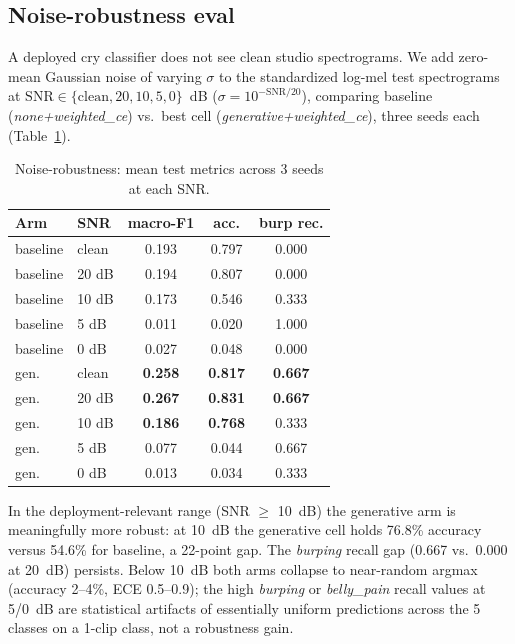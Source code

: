 \documentclass[pmlr,twocolumn,10pt]{jmlr}
\begin{document}
\subsection{Noise-robustness eval}\label{sec:noiserob}
A deployed cry classifier does not see clean studio spectrograms. We add zero-mean Gaussian noise of varying $\sigma$ to the standardized log-mel test spectrograms at $\mathrm{SNR} \in \{\text{clean}, 20, 10, 5, 0\}$~dB ($\sigma{=}10^{-\mathrm{SNR}/20}$), comparing baseline (\textit{none+weighted\_ce}) vs.\ best cell (\textit{generative+weighted\_ce}), three seeds each (Table~\ref{tab:robustness}).

\begin{table}[!t]
\centering
\footnotesize
\renewcommand{\arraystretch}{0.95}
\caption{Noise-robustness: mean test metrics across 3 seeds at each SNR.}\label{tab:robustness}
\begin{tabular}{llccc}
\toprule
Arm & SNR & macro-F1 & acc. & burp rec. \\
\midrule
baseline & clean & 0.193 & 0.797 & 0.000 \\
baseline & 20 dB & 0.194 & 0.807 & 0.000 \\
baseline & 10 dB & 0.173 & 0.546 & 0.333 \\
baseline & 5 dB  & 0.011 & 0.020 & 1.000 \\
baseline & 0 dB  & 0.027 & 0.048 & 0.000 \\
\midrule
gen.\ & clean & \textbf{0.258} & \textbf{0.817} & \textbf{0.667} \\
gen.\ & 20 dB & \textbf{0.267} & \textbf{0.831} & \textbf{0.667} \\
gen.\ & 10 dB & \textbf{0.186} & \textbf{0.768} & 0.333 \\
gen.\ & 5 dB  & 0.077 & 0.044 & 0.667 \\
gen.\ & 0 dB  & 0.013 & 0.034 & 0.333 \\
\bottomrule
\end{tabular}
\end{table}

In the deployment-relevant range (SNR $\ge$ 10~dB) the generative arm is meaningfully more robust: at 10~dB the generative cell holds 76.8\% accuracy versus 54.6\% for baseline, a 22-point gap. The \textit{burping} recall gap (0.667 vs.\ 0.000 at 20~dB) persists. Below 10~dB both arms collapse to near-random argmax (accuracy 2--4\%, ECE 0.5--0.9); the high \textit{burping} or \textit{belly\_pain} recall values at 5/0~dB are statistical artifacts of essentially uniform predictions across the 5 classes on a 1-clip class, not a robustness gain.
\end{document}
